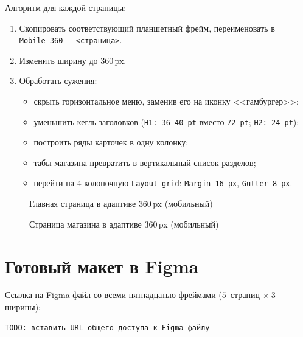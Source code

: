 Алгоритм для каждой страницы:
\begin{enumerate}
  \item Скопировать соответствующий планшетный фрейм, переименовать в
        \texttt{Mobile~360~--~<страница>}.
  \item Изменить ширину до \(360\,\)px.
  \item Обработать сужения:
  \begin{itemize}
    \item скрыть горизонтальное меню, заменив его на иконку
          <<гамбургер>>;
    \item уменьшить кегль заголовков (\texttt{H1: 36--40\,pt} вместо
          \texttt{72\,pt}; \texttt{H2: 24\,pt});
    \item построить ряды карточек в одну колонку;
    \item табы магазина превратить в вертикальный список разделов;
    \item перейти на 4-колоночную \texttt{Layout grid}:
          \texttt{Margin~16\,px}, \texttt{Gutter~8\,px}.
  \end{itemize}
\end{enumerate}

\begin{figure}[h]
  \centering
  \caption{Главная страница в адаптиве \(360\,\)px (мобильный)}
  \label{fig:mobile_home}
\end{figure}

\begin{figure}[h]
  \centering
  \caption{Страница магазина в адаптиве \(360\,\)px (мобильный)}
  \label{fig:mobile_shop}
\end{figure}

\section{Готовый макет в Figma}

Ссылка на Figma-файл со всеми пятнадцатью фреймами
(\(5\)~страниц \(\times~3\) ширины):

\begin{lstlisting}
TODO: вставить URL общего доступа к Figma-файлу
\end{lstlisting}

